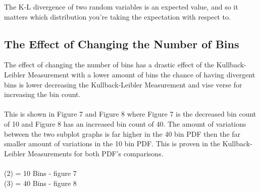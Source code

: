 \documentclass[a4paper]{article}
\begin{document}
The K-L divergence of two random variables is an expected value, and so it matters which distribution you're taking the expectation with respect to.

\subsection{The Effect of Changing the Number of Bins}
The effect of changing the number of bins has a drastic effect of the Kullback-Leibler Measurement with a lower amount of bins the chance of having divergent bins is lower decreasing the Kullback-Leibler Measurement and vise verse for increasing the bin count.
\\
\\
This is shown in Figure 7 and Figure 8 where Figure 7 is the decreased bin count of 10 and Figure 8 has an increased bin count of 40. The amount of variations between the two subplot graphs is far higher in the 40 bin PDF then the far smaller amount of variations in the 10 bin PDF. This is proven in the Kullback-Leibler Measurements for both PDF's comparisons. 
\\
\\
(2) = 10 Bins - figure 7\\
(3) = 40 Bins - figure 8
\end{document}
